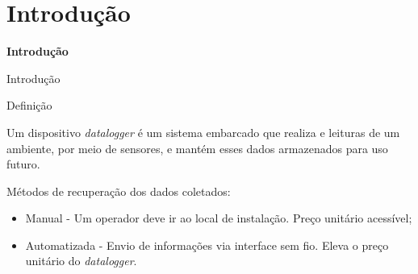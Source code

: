 \section{Introdução}


\begin{frame}
    
    \centering
    \color{blue_theme}\huge{\textbf{Introdução}}

\end{frame}



\begin{frame}{Introdução}
    \begin{block}{Definição}
        
        Um dispositivo \textit{datalogger} é um sistema embarcado que realiza e 
        leituras de um ambiente, por meio de sensores, e mantém esses dados
        armazenados para uso futuro.
    \end{block}

    Métodos de recuperação dos dados coletados: 
    
    \begin{itemize}
        \item Manual - Um operador deve ir ao local de instalação. Preço unitário acessível;  
        \item Automatizada - Envio de informações via interface sem fio. Eleva o preço unitário do \textit{datalogger}.
    \end{itemize}




\end{frame}




    

